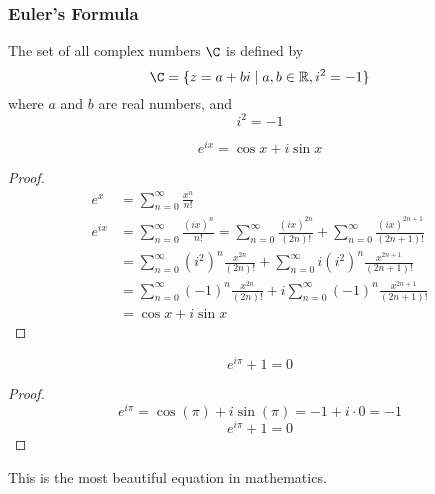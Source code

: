 \subsubsection*{Euler's Formula}

The set of all complex numbers \(\C\) is defined by
\[\C=\{z=a+bi\mid a,b\in\R,i^2=-1\}\]
where \(a\) and \(b\) are real numbers, and
\[i^2=-1\]
\begin{theorem}
    \[e^{ix}=\cos x+i\sin x\]
\end{theorem}
\begin{proof}
    \begin{align*}
        e^x &= \sum_{n=0}^\infty\frac{x^n}{n!} \\
        e^{ix} &= \sum_{n=0}^\infty\frac{(ix)^n}{n!}
        =\sum_{n=0}^\infty\frac{(ix)^{2n}}{(2n)!}
        +\sum_{n=0}^\infty\frac{(ix)^{2n+1}}{(2n+1)!} \\
        &= \sum_{n=0}^\infty(i^2)^n\frac{x^{2n}}{(2n)!}
        +\sum_{n=0}^\infty i(i^2)^n\frac{x^{2n+1}}{(2n+1)!} \\
        &= \sum_{n=0}^\infty(-1)^n\frac{x^{2n}}{(2n)!}
        +i\sum_{n=0}^\infty(-1)^n\frac{x^{2n+1}}{(2n+1)!} \\
        &= \cos x+i\sin x
    \end{align*}
\end{proof}
\begin{theorem}
    \[e^{i\pi}+1=0\]
\end{theorem}
\begin{proof}
    \[e^{i\pi}=\cos(\pi)+i\sin(\pi)=-1+i\cdot0=-1\]
    \[e^{i\pi}+1=0\]
\end{proof}
This is the most beautiful equation in mathematics.